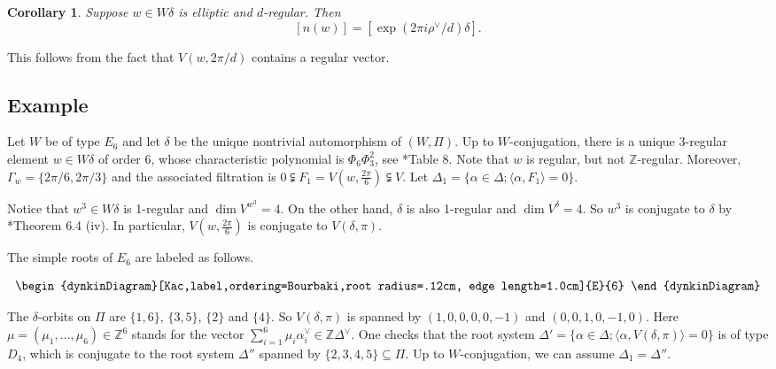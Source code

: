 \documentclass[10pt,leqno]{article}
\newtheorem{corollary}[equation]{Corollary}
\renewcommand{\a}{\mathfrak a}
\newcommand{\ch}[1]{#1^\vee}
\def\a{\alpha}
\def\G{\Gamma}
\def\d{\delta}
\begin{document}
\begin{corollary}
Suppose $w\in W\delta$ is elliptic and $d$-regular. Then
$$
[n(w)]=[\exp(2\pi i\ch\rho/d)\delta].
$$
\end{corollary}

This follows from the fact that $V(w,2\pi/d)$ contains a regular vector.

\begin{comment}
This follows from the fact that the sequence consisting of a singleton
$(2\pi/d)$ is admissible in the sense of
\cite{he_nie_minimal_finite}*{\S 5.2}, see Remark
\ref{r:full}.
\end{comment}


\subsection{Example}\label{eg:regular}
Let $W$ be of type $E_6$ and let $\d$ be the unique nontrivial
automorphism of $(W, \Pi)$. Up to $W$-conjugation, there is a unique
3-regular element $w \in W \d$ of order 6, whose characteristic
polynomial is $\Phi_6 \Phi_3^2$, see \cite{springer_regular}*{Table
  8}. Note that $w$ is regular, but not $\mathbb Z$-regular. Moreover,
$\G_w=\{2\pi/6, 2\pi/3\}$ and the associated filtration is
$0 \subsetneqq F_1 = V(w,\frac{2\pi}{6}) \subsetneqq V$. Let
$\Delta_1 = \{\a \in \Delta; \langle\alpha, F_1\rangle = 0\}$.

Notice that $w^3 \in W\d$ is 1-regular and $\dim V^{w^3}=4$. On the other hand, $\d$ is also 1-regular and $\dim V^\d=4$. So $w^3$ is conjugate to $\d$ by
\cite{springer_regular}*{Theorem 6.4 (iv)}. In particular, $V(w, \frac{2\pi}{6})$ is conjugate to  $V(\d, \pi)$.

The simple roots of $E_6$ are labeled as follows.

$$
\begin{dynkinDiagram}[Kac,label,ordering=Bourbaki,root radius=.12cm, edge  length=1.0cm]{E}{6}
\end{dynkinDiagram}
$$
\medskip

The $\d$-orbits on $\Pi$ are $\{1, 6\}$, $\{3, 5\}$, $\{2\}$ and $\{4\}$. So $V(\d, \pi)$ is spanned by $(1, 0, 0, 0, 0, -1)$ and $(0, 0, 1, 0, -1, 0)$. Here $\mu=(\mu_1, \dots, \mu_6) \in \mathbb Z^6$ stands for the vector $\sum_{i=1}^6 \mu_i \a_i^\vee \in \mathbb Z \Delta^\vee$. One checks that the root system $\Delta' = \{\a \in \Delta; \langle \a, V(\d, \pi)\rangle=0\}$ is of type $D_4$, which is conjugate to the root system $\Delta''$ spanned by $\{2, 3, 4, 5\} \subseteq \Pi$. Up to $W$-conjugation, we can assume $\Delta_1 = \Delta''$.
\end{document}
